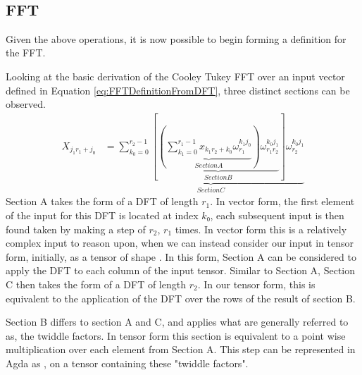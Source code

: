 \begin{code}
\AgdaSpace{}%
\AgdaSymbol{)}\AgdaSpace{}%
\AgdaSpace{}%
\AgdaSpace{}%
\AgdaSpace{}%
\AgdaSymbol{(}\AgdaSpace{}%
\AgdaSpace{}%
\AgdaSymbol{)}\AgdaSpace{}%
\<%
\\
%
\>[2]\AgdaSpace{}%
\AgdaSpace{}%
\AgdaSpace{}%
\AgdaSymbol{=}\AgdaSpace{}%
\AgdaSpace{}%
\AgdaSymbol{(}\AgdaSpace{}%
\AgdaSpace{}%
\AgdaSymbol{(}\AgdaSpace{}%
\AgdaSymbol{))}\<%
\end{code}


\clearpage
\subsection{FFT}
Given the above operations, it is now possible to begin forming a definition for
the FFT.

Looking at the basic derivation of the Cooley Tukey FFT over an input vector
defined in Equation \ref{eq:FFTDefinitionFromDFT}, three distinct sections can
be observed.
\begin{align}
    X_{j_1r_1+j_0}
      &=\underbrace{\sum^{r_2-1}_{k_0=0}{
        \left[
          \underbrace{
            \left(
              \underbrace{
                \sum^{r_1-1}_{k_1=0}x_{k_1r_2+k_0}\omega_{r_1}^{k_1j_0}
              }_{Section A} \right
            ) \omega_{r_1r_2}^{k_0j_1}
          }_{Section B}
        \right]
        \omega_{r_2}^{k_0j_1}
      }}_{Section C}
    \label{eq:FFTDefinitionLabeled}
\end{align}
Section A takes the form of a DFT of length $r_1$.
In vector form, the first element of the input for this DFT is located at index $k₀$, 
each subsequent input is then found taken by making a step of $r_2$, $r_1$ times.
In vector form this is a relatively complex input to reason upon, when we can 
instead consider our input in tensor form, initially, as a tensor of shape .
In this form, Section A can be considered to apply the DFT to each column of the
input tensor.
Similar to Section A, Section C then takes the form of a DFT of length $r_2$.
In our  tensor form, this is equivalent to the application of 
the DFT over the rows of the result of section B.

Section B differs to section A and C, and applies what are generally referred to
as, the twiddle factors.
In tensor form this section is equivalent to a point wise multiplication 
over each element from Section A.
This step can be represented in Agda as , on a tensor containing 
these "twiddle factors".

